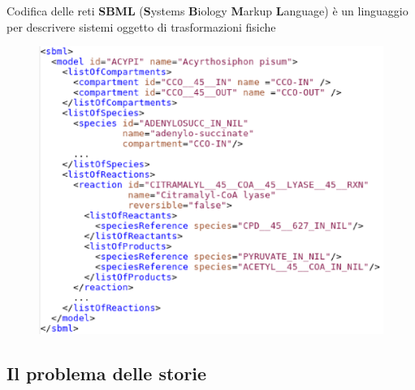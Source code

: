 \documentclass{beamer}
\begin{document}
\begin{frame}{Codifica delle reti}%
  \textbf{SBML} (\textbf{S}ystems \textbf{B}iology \textbf{M}arkup
  \textbf{L}anguage) \`e un linguaggio per descrivere sistemi oggetto
  di trasformazioni fisiche
  \begin{figure}
    \includegraphics[scale=.4]{images/sbml-code-chunk.eps}
  \end{figure}
\end{frame}

\subsection{Il problema delle storie}
\end{document}
